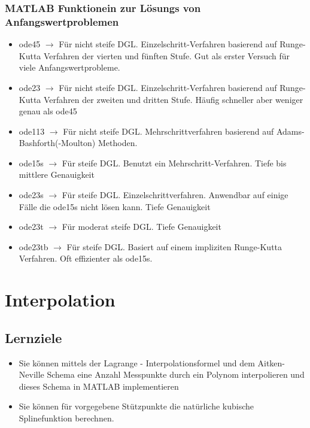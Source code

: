\documentclass{article}
\theoremstyle{satz}
\theoremstyle{definition}
\begin{document}
\subsubsection{MATLAB Funktionein zur Lösungs von Anfangswertproblemen}
\begin{itemize}
	\item {ode45 $\rightarrow$ Für nicht steife DGL. Einzelschritt-Verfahren basierend auf Runge-Kutta Verfahren der vierten und fünften Stufe. Gut als erster Versuch für viele Anfangswertprobleme.}
	\item {ode23 $\rightarrow$ Für nicht steife DGL. Einzelschritt-Verfahren basierend auf Runge-Kutta Verfahren der zweiten und dritten Stufe. Häufig schneller aber weniger genau als ode45}
	\item {ode113 $\rightarrow$ Für nicht steife DGL. Mehrschrittverfahren basierend auf Adams-Bashforth(-Moulton) Methoden.}
	\item {ode15s $\rightarrow$ Für steife DGL. Benutzt ein Mehrschritt-Verfahren. Tiefe bis mittlere Genauigkeit}
	\item {ode23s $\rightarrow$ Für steife DGL. Einzelschrittverfahren. Anwendbar auf einige Fälle die ode15s nicht lösen kann. Tiefe Genauigkeit}
	\item {ode23t $\rightarrow$ Für moderat steife DGL. Tiefe Genauigkeit}
	\item {ode23tb $\rightarrow$ Für steife DGL. Basiert auf einem impliziten Runge-Kutta Verfahren. Oft effizienter als ode15s.}
\end{itemize}

\section{Interpolation}

\subsection{Lernziele}
\begin{itemize}
	\item {Sie können mittels der Lagrange - Interpolationsformel und dem Aitken-Neville Schema eine Anzahl Messpunkte durch ein Polynom interpolieren und dieses Schema in MATLAB implementieren}
	\item Sie können für vorgegebene Stützpunkte die natürliche kubische Splinefunktion berechnen.
\end{itemize}
\end{document}
